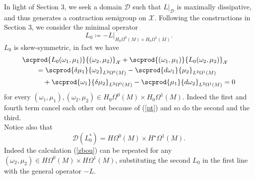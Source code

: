 \documentclass{ifacconf}
\newcommand{\drh}[2]{\Omega^{#2}(#1)}
\begin{document}
In light of Section $3$, we seek a domain $\mathcal{D}$ such that $L|_{\mathcal{D}}$ is maximally dissipative, and thus generates a contraction semigroup on $\mathcal{X}$. Following the constructions in Section $3$, we consider the minimal operator
\[
    L_0\coloneqq -L|_{H_0\drh{M}{0}\times H_0\drh{M}{1}}.
\]
$L_0$ is skew-symmetric, in fact we have
\begin{align}\label{zbou}
\begin{aligned}
\MoveEqLeft
    \scprod{L_0(\omega_1,\mu_1)}{(\omega_2,\mu_2)}_{\mathcal{X}}+\scprod{(\omega_1,\mu_1)}{L_0(\omega_2,\mu_2)}_{\mathcal{X}} \\
    & = \scprod{\delta\mu_1}{\omega_2}_{L^2\drh{M}{0}}-\scprod{d\omega_1}{\mu_2}_{L^2\drh{M}{1}} \\
    &\quad + \scprod{\omega_1}{\delta\mu_2}_{L^2\drh{M}{0}}-\scprod{\mu_1}{d\omega_2}_{L^2\drh{M}{1}}=0
\end{aligned}
\end{align}
for every $(\omega_1,\mu_1),(\omega_2,\mu_2)\in H_0\drh{M}{0}\times H_0\drh{M}{1}$. Indeed the first and fourth term cancel each other out because of (\ref{pt}) and so do the second and the third.\\
Notice also that 
\[
    \mathcal{D}(L_0^*)=H\drh{M}{0}\times H^{\star}\drh{M}{1}.
\]
Indeed the calculation (\ref{zbou}) can be repeated for any $(\omega_2,\mu_2)\in H\drh{M}{0}\times H\drh{M}{1}$, substituting the second $L_0$ in the first line with the general operator $-L$.
\end{document}
